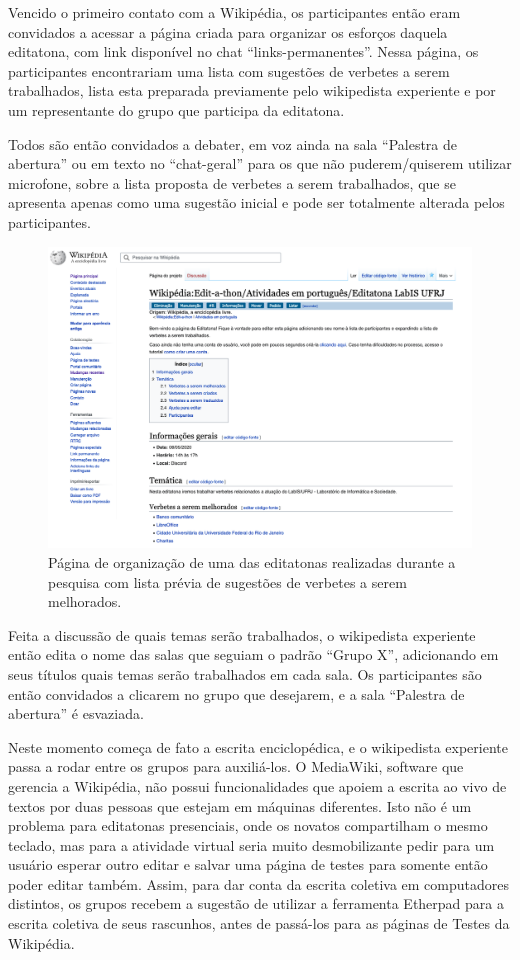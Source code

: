  Vencido o primeiro contato com a Wikipédia, os participantes então eram convidados a acessar a página criada para organizar os esforços daquela editatona, com link disponível no chat “links-permanentes”. Nessa página, os participantes encontrariam uma lista com sugestões de verbetes a serem trabalhados, lista esta preparada previamente pelo wikipedista experiente e por um representante do grupo que participa da editatona.
 
 Todos são então convidados a debater, em voz ainda na sala “Palestra de abertura” ou em texto no “chat-geral” para os que não puderem/quiserem utilizar microfone, sobre a lista proposta de verbetes a serem trabalhados, que se apresenta apenas como uma sugestão inicial e pode ser totalmente alterada pelos participantes.

\begin{figure}[H]
    \centering
    \includegraphics[width=1\textwidth]{Images/pagina_editatona.png}
    \caption{Página de organização de uma das editatonas realizadas durante a pesquisa com lista prévia de sugestões de verbetes a serem melhorados.}
    \label{fig:pagina_editatona}
\end{figure}

 Feita a discussão de quais temas serão trabalhados, o wikipedista experiente então edita o nome das salas que seguiam o padrão ``Grupo X'', adicionando em seus títulos quais temas serão trabalhados em cada sala. Os participantes são então convidados a clicarem no grupo que desejarem, e a sala ``Palestra de abertura'' é esvaziada.
 
 Neste momento começa de fato a escrita enciclopédica, e o wikipedista experiente passa a rodar entre os grupos para auxiliá-los. O MediaWiki, software que gerencia a Wikipédia, não possui funcionalidades que apoiem a escrita ao vivo de textos por duas pessoas que estejam em máquinas diferentes. Isto não é um problema para editatonas presenciais, onde os novatos compartilham o mesmo teclado, mas para a atividade virtual seria muito desmobilizante pedir para um usuário esperar outro editar e salvar uma página de testes para somente então poder editar também. Assim, para dar conta da escrita coletiva em computadores distintos, os grupos recebem a sugestão de utilizar a ferramenta Etherpad para a escrita coletiva de seus rascunhos, antes de passá-los para as páginas de Testes da Wikipédia. 
 
